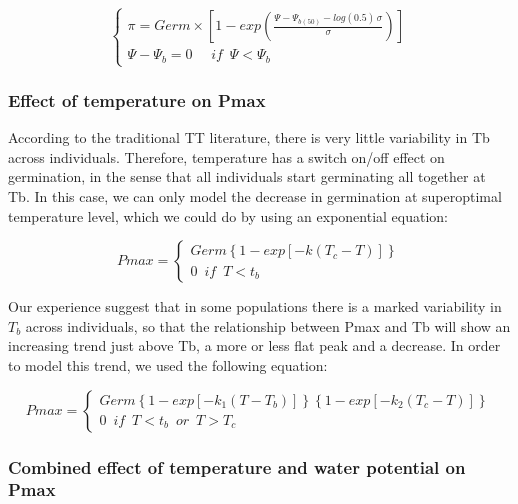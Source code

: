 \documentclass[a4paper,12pt]{article}
\begin{document}
\begin{equation}
\left\{ {\begin{array}{*{20}{l}}
\pi = Germ \times \left[ 1 - exp \left( \frac{ \Psi - \Psi_{b(50)} - log(0.5) \, \sigma  }{\sigma} \right) \right] \\
\Psi - \Psi_b = 0 \,\,\,\,\,\,\,\, if \,\,\, \Psi < \Psi_b
\end{array}} \right.
\end{equation}

\subsubsection{Effect of temperature on
Pmax}\label{effect-of-temperature-on-pmax}

According to the traditional TT literature, there is very little
variability in Tb across individuals. Therefore, temperature has a
switch on/off effect on germination, in the sense that all individuals
start germinating all together at Tb. In this case, we can only model
the decrease in germination at superoptimal temperature level, which we
could do by using an exponential equation:

\begin{equation}
Pmax = \left\{ {\begin{array}{*{20}{l}}
Germ \left\{ 1 - exp \left[ -k (T_c - T) \right] \right\}\\
0 \,\,\, if \,\,\, T < t_b
\end{array}} \right.
\end{equation}

Our experience suggest that in some populations there is a marked
variability in \(T_b\) across individuals, so that the relationship
between Pmax and Tb will show an increasing trend just above Tb, a more
or less flat peak and a decrease. In order to model this trend, we used
the following equation:

\begin{equation}
Pmax = \left\{ {\begin{array}{*{20}{l}}
Germ \left\{ 1 - exp \left[ -k_1 (T - T_b) \right] \right\} \left\{ 1 - exp \left[ -k_2 (T_c - T) \right] \right\}\\
0 \,\,\, if \,\,\, T < t_b \,\,\, or \,\,\, T > T_c
\end{array}} \right.
\end{equation}

\subsubsection{Combined effect of temperature and water potential on
Pmax}\label{combined-effect-of-temperature-and-water-potential-on-pmax}
\end{document}

